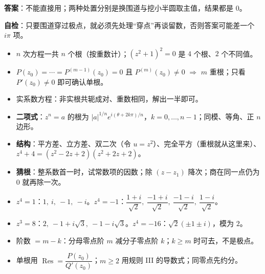 \documentclass[11pt]{ctexart}
\let\origsubhdr\subhdr
\renewcommand{\subhdr}[1]{\par\needspace{4\baselineskip}\origsubhdr{#1}}
\let\orighdr\hdr
\renewcommand{\hdr}[2]{\par\orighdr{#1}{#2}}
\begin{document}
\textbf{答案}：不能直接用；两种处置分别是换围道与挖小半圆取主值，结果都是 $0$。

\textbf{自检}：只要围道穿过极点，就必须先处理“穿点”再谈留数，否则答案可能差一个 $i\pi$ 项。

\flowerrule

\needspace{0.66\textheight}


\begin{itemize}
\item $n$ 次方程一共 $n$ 个根（按重数计）；$(z^{2}+1)^{2}=0$ 是 $4$ 个根、$2$ 个不同值。
\item $P(z_0)=\cdots=P^{(m-1)}(z_0)=0$ 且 $P^{(m)}(z_0)\ne0$ $\Longrightarrow$ $m$ 重根；只看 $P'(z_0)\ne0$ 即可确认单根。
\item 实系数方程：非实根共轭成对、重数相同，解出一半即可。
\end{itemize}


\begin{itemize}
\item \textbf{二项式}：$z^{n}=a$ 的根为 $|a|^{1/n}e^{i(\theta+2k\pi)/n}$，$k=0,\dots,n-1$；同模、等角、正 $n$ 边形。
\item \textbf{结构}：平方差、立方差、双二次（令 $u=z^{2}$）、完全平方（重根就从这里来）、
$z^{4}+4=(z^{2}-2z+2)(z^{2}+2z+2)$。
\item \textbf{猜根}：整系数首一时，试常数项的因数；除 $(z-z_1)$ 降次；商在同一点仍为 $0$ 就再除一次。
\end{itemize}


\begin{itemize}
\item $z^{4}=1$：$1,\ i,\ -1,\ -i$。\quad $z^{4}=-1$：$\dfrac{1+i}{\sqrt2},\ \dfrac{-1+i}{\sqrt2},\ \dfrac{-1-i}{\sqrt2},\ \dfrac{1-i}{\sqrt2}$。
\item $z^{3}=8$：$2,\ -1+i\sqrt3,\ -1-i\sqrt3$。\quad $z^{4}=-16$：$\sqrt2(\pm1\pm i)$，模为 $2$。
\end{itemize}


\begin{itemize}
\item 阶数 $=m-k$：分母零点阶 $m$ 减分子零点阶 $k$；$k\ge m$ 时可去，不是极点。
\item 单根用 $\operatorname{Res}=\dfrac{P(z_0)}{Q'(z_0)}$；$m\ge2$ 用规则 III 的导数式；同零点先约分。
\end{itemize}
\end{document}

